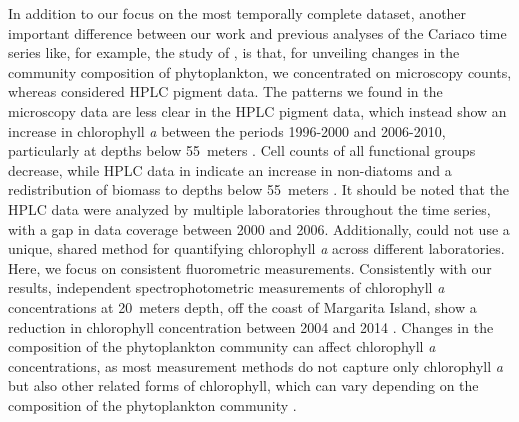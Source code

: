 \documentclass[draft]{agujournal2019}
\begin{document}
In addition to our focus on the most temporally complete dataset, another important difference between our work and previous analyses of the Cariaco time series like, for example, the study of \citeauthor{pinckney_phytoplankton_2015}, is that, for unveiling changes in the community composition of phytoplankton, we concentrated on  microscopy counts, whereas  \citeauthor{pinckney_phytoplankton_2015} considered HPLC pigment data. The patterns we found in the microscopy data are less clear in the HPLC pigment data, which instead show an increase in chlorophyll \textit{a} between the periods 1996-2000 and 2006-2010, particularly at depths below \qty{55}{meters} \cite{pinckney_phytoplankton_2015}. Cell counts of all functional groups decrease, while HPLC data in  \citeauthor{pinckney_phytoplankton_2015} indicate an increase in non-diatoms and a redistribution of biomass to depths below \qty{55}{meters} . It should be noted that the HPLC data were analyzed by multiple laboratories throughout the time series, with a gap in data coverage between 2000 and 2006. Additionally, \citeauthor{pinckney_phytoplankton_2015} could not use a unique, shared method for quantifying chlorophyll \textit{a} across different laboratories. 
Here, we focus on consistent fluorometric measurements. Consistently with our results, independent spectrophotometric measurements of chlorophyll \textit{a} concentrations at \qty{20}{meters} depth, off the coast of Margarita Island, show a reduction in chlorophyll concentration between 2004 and 2014 \cite{gomez_gaspar_variacion_2025}. Changes in the composition of the phytoplankton community can affect chlorophyll \textit{a} concentrations, as most measurement methods do not capture only chlorophyll \textit{a} but also other related forms of chlorophyll, which can vary depending on the composition of the phytoplankton community \cite{welschmeyer_fluorometric_1994}.
\end{document}
